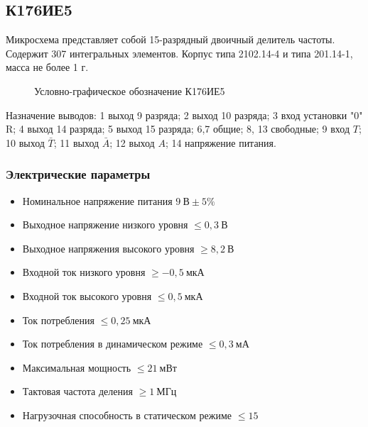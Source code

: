 \subsection*{К176ИЕ5}

Микросхема представляет собой 15-разрядный двоичный делитель частоты. Содержит 307 интегральных элементов. Корпус типа 2102.14-4 и типа 201.14-1, масса не более 1 г.

\begin{figure}[ht]
  
  \caption{Условно-графическое обозначение К176ИЕ5}
  \label{img:k176ie5}
\end{figure}

Назначение выводов: 1 \longndash выход 9 разряда; 2 \longndash выход 10 разряда; 3 \longndash вход установки "0" R; 4 \longndash выход 14 разряда; 5 \longndash выход 15 разряда; 6,7 \longndash общие; 8, 13 \longndash свободные; 9 \longndash вход $T$; 10 \longndash выход $\bar{T}$; 11 \longndash выход $\bar{A}$; 12 \longndash выход $A$; 14 \longndash напряжение питания.

\subsubsection*{Электрические параметры}
\begin{itemize}
	\item[] Номинальное напряжение питания \dotfill $9~\text{В} \pm 5\%$
	\item[] Выходное напряжение низкого уровня \dotfill $\leq 0,3~\text{В}$
	\item[] Выходное напряжения высокого уровня \dotfill $\geq 8,2~\text{В}$
	\item[] Входной ток низкого уровня \dotfill $\geq -0,5~\text{мкА}$
	\item[] Входной ток высокого уровня \dotfill $\leq 0,5~\text{мкА}$
	\item[] Ток потребления \dotfill $\leq 0,25~\text{мкА}$
	\item[] Ток потребления в динамическом режиме \dotfill $\leq 0,3~\text{мА}$
	\item[] Максимальная мощность \dotfill $\leq 21~\text{мВт}$
	\item[] Тактовая частота деления \dotfill $\geq 1~\text{МГц}$
	\item[] Нагрузочная способность в статическом режиме \dotfill $\leq 15$
\end{itemize}

